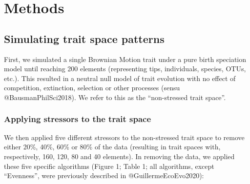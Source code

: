 \documentclass[12pt,letterpaper]{article}
\begin{document}
\section{Methods}
\subsection{Simulating trait space patterns}

First, we simulated a single Brownian Motion trait under a pure birth speciation model until reaching 200 elements (representing tips, individuals, species, OTUs, etc.).
This resulted in a neutral null model of trait evolution with no effect of competition, extinction, selection or other processes (sensu @BausmanPhilSci2018). We refer to this as the “non-stressed trait space”.

\subsubsection{Applying stressors to the trait space}

We then applied five different stressors to the non-stressed trait space to remove either 20\%, 40\%, 60\% or 80\% of the data (resulting in trait spaces with, respectively, 160, 120, 80 and 40 elements).
In removing the data, we applied these five specific algorithms (Figure 1; Table 1; all algorithms, except “Evenness”, were previously described in @GuillermeEcoEvo2020):
\end{document}
